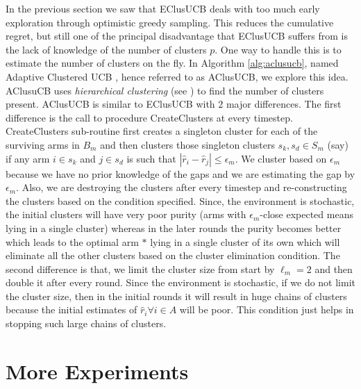 In the previous section we saw that EClusUCB deals with too much early exploration through optimistic greedy sampling. This reduces the cumulative regret, but still one of the principal disadvantage that EClusUCB suffers from is the lack of knowledge of the number of clusters $p$. One way to handle this is to estimate the number of clusters on the fly. In Algorithm \ref{alg:aclusucb}, named Adaptive Clustered UCB , hence referred to as AClusUCB, we explore this idea. AClusuCB uses \emph{hierarchical clustering} (see \cite{friedman2001elements}) to find the number of clusters present. AClusUCB is similar to EClusUCB with $2$ major differences. The first difference is the call to procedure CreateClusters at every timestep. CreateClusters sub-routine first creates a singleton cluster for each of the surviving arms in $B_{m}$ and then clusters those singleton clusters $s_{k}, s_{d}\in S_{m}$ (say) if any arm $i\in s_{k}$ and $j\in s_{d}$ is such that $|\hat{r}_{i}-\hat{r}_{j}|\leq \epsilon_{m}$. We cluster based on $\epsilon_{m}$ because we have no prior knowledge of the gaps and we are estimating the gap by $\epsilon_{m}$. Also, we are destroying the clusters after every timestep and re-constructing the clusters based on the condition specified. Since, the environment is stochastic, the initial clusters will have very poor purity (arms with $\epsilon_{m}$-close expected means lying in a single cluster) whereas in the later rounds the purity becomes better which leads to the optimal arm $*$ lying in a single cluster of its own which will eliminate all the other clusters based on the cluster elimination condition. The second difference is that, we limit the cluster size from start by $\ell_{m}=2$ and then double it after every round. Since the environment is stochastic, if we do not limit the cluster size, then in the initial rounds it will result in huge chains of clusters because the initial estimates of $\hat{r}_{i}\forall i\in A$ will be poor. This condition just helps in stopping such large chains of clusters.    

\section{More Experiments}
\label{App:MoreExp}

